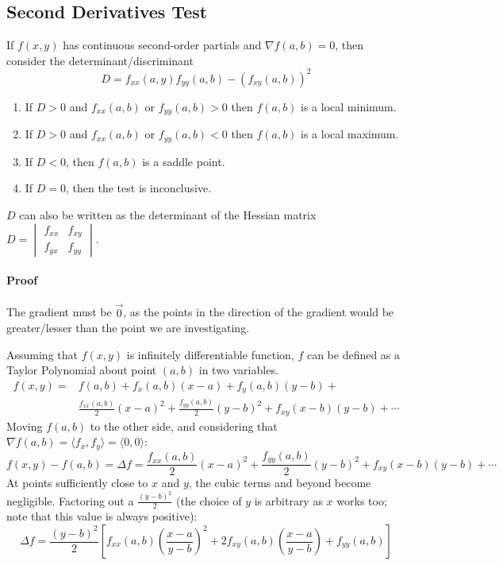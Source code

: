 \documentclass{article}
\newcommand{\vect}[1]{\ensuremath{\overrightarrow{#1}}}
\begin{document}
\subsection{Second Derivatives Test}
If $f(x,y)$ has continuous second-order partials and $\nabla f(a,b)=0$, then consider the determinant/discriminant
\[
D = f_{xx}(a,y)f_{yy}(a,b)-\left(f_{xy}(a,b)\right)^2
\]
\begin{enumerate}
    \item If $D>0$ and $f_{xx}(a,b)$ or $f_{yy}(a,b) > 0$ then $f(a,b)$ is a local minimum.
    \item If $D>0$ and $f_{xx}(a,b)$ or $f_{yy}(a,b) < 0$ then $f(a,b)$ is a local maximum.
    \item If $D<0$, then $f(a,b)$ is a saddle point.
    \item If $D=0$, then the test is inconclusive.
\end{enumerate}
$D$ can also be written as the determinant of the Hessian matrix \(D=\begin{vmatrix}
    f_{xx} & f_{xy}\\
    f_{yx} & f_{yy}
\end{vmatrix}\).

\paragraph{Proof}
The gradient must be $\vect{0}$, as the points in the direction of the gradient would be greater/lesser than the point we are investigating.

Assuming that $f(x,y)$ is infinitely differentiable function, $f$ can be defined as a Taylor Polynomial about point $(a,b)$ in two variables.
\begin{align*}
    f(x,y) = &f(a,b) + f_x(a,b)(x-a) + f_y(a,b)(y-b) +\\
             &\frac{f_{xx}(a,b)}{2}(x-a)^2+\frac{f_{yy}(a,b)}{2}(y-b)^2+f_{xy}(x-b)(y-b)+\cdots
\end{align*}
Moving $f(a,b)$ to the other side, and considering that $\nabla{f}(a,b)=\langle f_x, f_y \rangle = \langle 0,0 \rangle$:
\[
    f(x,y)-f(a,b)=\Delta{f} = \frac{f_{xx}(a,b)}{2}(x-a)^2+\frac{f_{yy}(a,b)}{2}(y-b)^2+f_{xy}(x-b)(y-b)+\cdots
\]
At points sufficiently close to $x$ and $y$, the cubic terms and beyond become negligible. Factoring out a $\frac{\left(y-b\right)^2}{2}$ (the choice of $y$ is arbitrary as $x$ works too; note that this value is always positive):
\[
    \Delta{f} = \frac{\left(y-b\right)^2}{2}\left[f_{xx}(a,b)\left(\frac{x-a}{y-b}\right)^2 + 2f_{xy}(a,b)\left(\frac{x-a}{y-b}\right)+f_{yy}(a,b)\right]
\]
\end{document}
